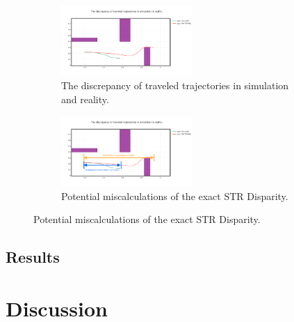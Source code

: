 \begin{figure}[H]
    \centering
    \begin{subfigure}[b]{0.8\textwidth}
    	\centering
        \includegraphics[width=5cm]{include/images/trajectory_discrepancy.PNG}
        \caption{The discrepancy of traveled trajectories in simulation and reality.}
        \label{fig:trajectory_discrepancy}
    \end{subfigure}
    \begin{subfigure}[b]{0.8\textwidth}
    	\centering
        \includegraphics[width=5cm]{include/images/trajectory_discrepancy_wrong_measure.PNG}
        \caption{Potential miscalculations of the exact STR Disparity.}
        \label{fig:trajectory_discrepancy_wrong_measure}
    \end{subfigure}
	\label{fig:real_based_resultsI}
\end{figure}



\subsection{Results}




\section{Discussion}



